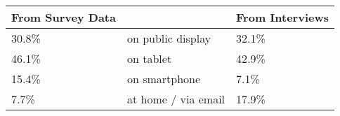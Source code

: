 \begin{tabular}{lllll}
\toprule
\multicolumn{2}{l}{\textbf{From Survey Data}} &  & \multicolumn{2}{l}{\textbf{From Interviews}} \\
\midrule
30.8\%                   & \multicolumn{3}{l}{on public display}      & 32.1\%                  \\
46.1\%                   & \multicolumn{3}{l}{on tablet}              & 42.9\%                  \\
15.4\%                   & \multicolumn{3}{l}{on smartphone}          & 7.1\%                   \\
7.7\%                    & \multicolumn{3}{l}{at home / via email}    & 17.9\%                 \\
\bottomrule
\end{tabular}

